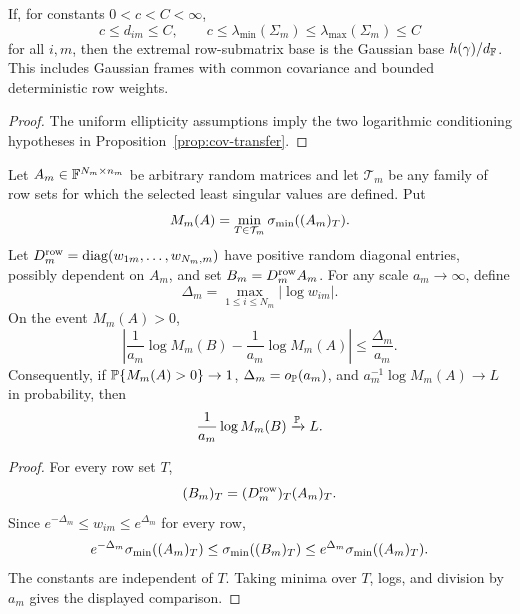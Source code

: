 \begin{corollary}\label{cor:elliptic-gaussian}
If, for constants \(0<c<C<\infty\),
\[
  c\le d_{im}\le C,\qquad
  c\le\lambda_{\min}(\Sigma_m)\le\lambda_{\max}(\Sigma_m)\le C
\]
for all \(i,m\), then the extremal row-submatrix base is the Gaussian base
\(h(\gamma)/d_{\mathbb{F}}\).  This includes Gaussian frames with common covariance and
bounded deterministic row weights.
\end{corollary}

\begin{proof}
The uniform ellipticity assumptions imply the two logarithmic conditioning
hypotheses in Proposition~\ref{prop:cov-transfer}.
\end{proof}

\begin{proposition}\label{prop:random-row-weight}
Let \(A_m\in\mathbb{F}^{N_m\times n_m}\) be arbitrary random matrices and let
\(\mathcal T_m\) be any family of row sets for which the selected least
singular values are defined.  Put
\[
  M_m(A)=\min_{T\in\mathcal T_m}\sigma_{\min}((A_m)_T).
\]
Let \(D_m^{\rm row}=\operatorname{diag}(w_{1m},\ldots,w_{N_m,m})\) have positive
random diagonal entries, possibly dependent on \(A_m\), and set
\(B_m=D_m^{\rm row}A_m\).  For
any scale \(a_m\to\infty\), define
\[
  \Delta_m=\max_{1\le i\le N_m}|\log w_{im}|.
\]
On the event \(M_m(A)>0\),
\[
  \left|\frac1{a_m}\log M_m(B)-\frac1{a_m}\log M_m(A)\right|
  \le \frac{\Delta_m}{a_m}.
\]
Consequently, if \(\mathbb{P}\{M_m(A)>0\}\to1\),
\(\Delta_m=o_{\mathbb{P}}(a_m)\), and
\(a_m^{-1}\log M_m(A)\to L\) in probability, then
\[
  \frac1{a_m}\log M_m(B)\xrightarrow{\mathbb{P}} L.
\]
\end{proposition}

\begin{proof}
For every row set \(T\),
\[
  (B_m)_T=(D_m^{\rm row})_T(A_m)_T.
\]
Since \(e^{-\Delta_m}\le w_{im}\le e^{\Delta_m}\) for every row,
\[
  e^{-\Delta_m}\sigma_{\min}((A_m)_T)
  \le \sigma_{\min}((B_m)_T)
  \le e^{\Delta_m}\sigma_{\min}((A_m)_T).
\]
The constants are independent of \(T\).  Taking minima over \(T\), logs, and
division by \(a_m\) gives the displayed comparison.
\end{proof}

